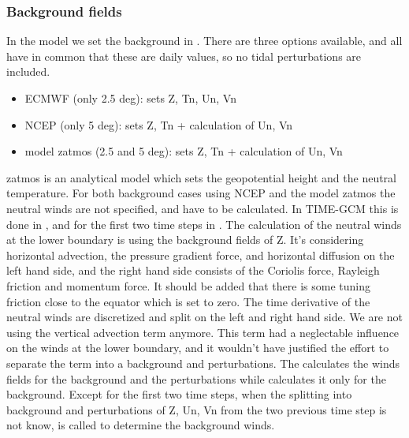 \subsubsection*{Background fields}
%
In the model we set the background in . There are three options
available, and all have in common that these are daily values, so no tidal
perturbations are included.
%
\begin{itemize}
  \item ECMWF (only 2.5 deg): sets Z, Tn, Un, Vn
  \item NCEP   (only 5 deg): sets Z, Tn + calculation of Un, Vn
  \item model zatmos (2.5 and 5 deg): sets Z, Tn + calculation of Un, Vn
\end{itemize} 
%
zatmos is an analytical model which sets the geopotential height and the
neutral temperature. For both background cases using NCEP and the model zatmos the
neutral winds are not specified, and have to be calculated. In TIME-GCM this is
done in , and for the first two time steps in . The calculation of the neutral winds at the lower boundary is using the
background fields of Z. It's considering horizontal advection, the pressure
gradient force, and horizontal diffusion on the left hand side, and the right hand
side consists of the Coriolis force, Rayleigh friction and momentum force. It
should be added that there is some tuning friction close to the equator which is
set to zero. The
time derivative of the neutral winds are discretized and split on the left and right
hand side. We are not using the vertical advection term anymore. This term had a
neglectable influence on the winds at the lower boundary, and it wouldn't have
justified the effort to separate the term into a background and perturbations. The
 calculates the winds fields for the background and the
perturbations while  calculates it only for the background.
Except for the first two time steps, when the splitting into background and
perturbations of Z, Un, Vn from the two previous time step is not know, 
 is called to determine the background winds.
%
